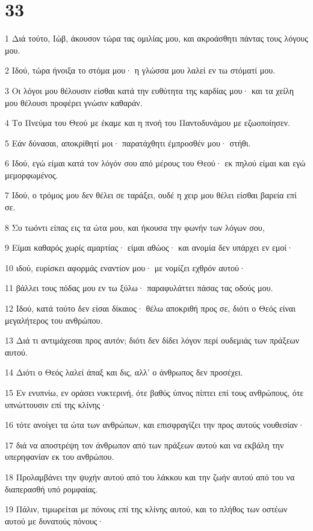 \chapter{33}

\par 1 Διά τούτο, Ιώβ, άκουσον τώρα τας ομιλίας μου, και ακροάσθητι πάντας τους λόγους μου.
\par 2 Ιδού, τώρα ήνοιξα το στόμα μου· η γλώσσα μου λαλεί εν τω στόματί μου.
\par 3 Οι λόγοι μου θέλουσιν είσθαι κατά την ευθύτητα της καρδίας μου· και τα χείλη μου θέλουσι προφέρει γνώσιν καθαράν.
\par 4 Το Πνεύμα του Θεού με έκαμε και η πνοή του Παντοδυνάμου με εζωοποίησεν.
\par 5 Εάν δύνασαι, αποκρίθητί μοι· παρατάχθητι έμπροσθέν μου· στήθι.
\par 6 Ιδού, εγώ είμαι κατά τον λόγόν σου από μέρους του Θεού· εκ πηλού είμαι και εγώ μεμορφωμένος.
\par 7 Ιδού, ο τρόμος μου δεν θέλει σε ταράξει, ουδέ η χειρ μου θέλει είσθαι βαρεία επί σε.
\par 8 Συ τωόντι είπας εις τα ώτα μου, και ήκουσα την φωνήν των λόγων σου,
\par 9 Είμαι καθαρός χωρίς αμαρτίας· είμαι αθώος· και ανομία δεν υπάρχει εν εμοί·
\par 10 ιδού, ευρίσκει αφορμάς εναντίον μου· με νομίζει εχθρόν αυτού·
\par 11 βάλλει τους πόδας μου εν τω ξύλω· παραφυλάττει πάσας τας οδούς μου.
\par 12 Ιδού, κατά τούτο δεν είσαι δίκαιος· θέλω αποκριθή προς σε, διότι ο Θεός είναι μεγαλήτερος του ανθρώπου.
\par 13 Διά τι αντιμάχεσαι προς αυτόν; διότι δεν δίδει λόγον περί ουδεμιάς των πράξεων αυτού.
\par 14 Διότι ο Θεός λαλεί άπαξ και δις, αλλ' ο άνθρωπος δεν προσέχει.
\par 15 Εν ενυπνίω, εν οράσει νυκτερινή, ότε βαθύς ύπνος πίπτει επί τους ανθρώπους, ότε υπνώττουσιν επί της κλίνης·
\par 16 τότε ανοίγει τα ώτα των ανθρώπων, και επισφραγίζει την προς αυτούς νουθεσίαν·
\par 17 διά να αποστρέψη τον άνθρωπον από των πράξεων αυτού και να εκβάλη την υπερηφανίαν εκ του ανθρώπου.
\par 18 Προλαμβάνει την ψυχήν αυτού από του λάκκου και την ζωήν αυτού από του να διαπερασθή υπό ρομφαίας.
\par 19 Πάλιν, τιμωρείται με πόνους επί της κλίνης αυτού, και το πλήθος των οστέων αυτού με δυνατούς πόνους·
